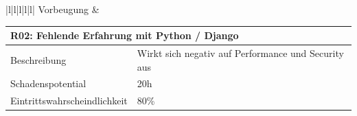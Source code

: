 \begin{table}[H]
\begin{tabular}{|l|l|l|l|l|}
Vorbeugung                       &  \\ \hline
\end{tabular}
\caption{VueJS Risiken}
\label{my-label}
\end{table}


\begin{table}[H]
\centering
\begin{tabular}{|l|l|l|l|l|}
\hline
\multicolumn{5}{|l|}{R02: Fehlende Erfahrung mit Python / Django}                                                                                                                                                                                                                                                                                                                                                                                                                                     \\ \hline
Beschreibung                      & \multicolumn{4}{l|}{Wirkt sich negativ auf Performance und Security aus}                                                                                                                                                                                                                                                                                                                                                                                          \\ \hline
Schadenspotential                 & \multicolumn{4}{l|}{20h}                                                                                                                                                                                                                                                                                                                                                                                                                                          \\ \hline
Eintrittswahrscheindlichkeit      & \multicolumn{4}{l|}{80\%}                                                                                                                                                                                                                                                                                                                                                                                                                                         \\ \hline

\end{tabular}
\end{table}
